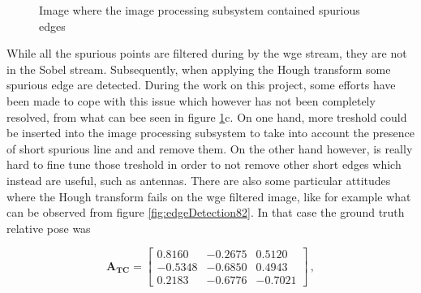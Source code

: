 \begin{figure}[htbp]
  \centering
  \qquad
  \qquad
  \qquad
  \caption{Image where the image processing subsystem contained spurious edges}
  \label{fig:edgeDetection204}
\end{figure}

While all the spurious points are filtered during by the \acrshort{wge} stream, they are not in the Sobel stream. Subsequently, when applying the Hough transform some spurious edge are detected. During the work on this project, some efforts have been made to cope with this issue which however has not been completely resolved, from what can bee seen in figure \ref{fig:edgeDetection204}c. On one hand, more treshold could be inserted into the image processing subsystem to take into account the presence of short spurious line and and remove them. On the other hand however, is really hard to fine tune those treshold in order to not remove other short edges which instead are useful, such as antennas.
There are also some particular attitudes where the Hough transform fails on the \acrshort{wge} filtered image, like for example what can be observed from figure \ref{fig:edgeDetection82}. In that case the ground truth relative pose was

\begin{equation*}
  \mathbf{A_{TC}} = \begin{bmatrix}
    0.8160 & -0.2675 & 0.5120 \\
    -0.5348        & -0.6850 & 0.4943 \\
    0.2183         & -0.6776 & -0.7021
  \end{bmatrix} \,,
\end{equation*}

